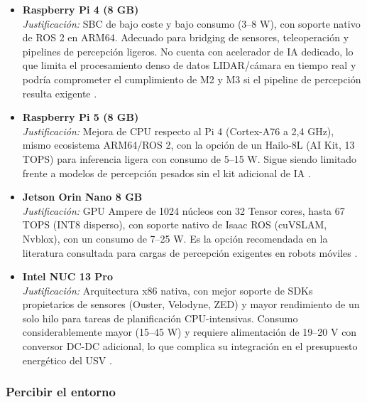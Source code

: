 \begin{itemize}

    \item \textbf{Raspberry Pi 4 (8 GB)} \\
    \textit{Justificación:} SBC de bajo coste y bajo consumo (3--8 W), con
    soporte nativo de ROS 2 en ARM64. Adecuado para bridging de sensores,
    teleoperación y pipelines de percepción ligeros. No cuenta con acelerador de IA dedicado,
    lo que limita el procesamiento denso de datos LIDAR/cámara en tiempo real y podría
    comprometer el cumplimiento de M2 y M3 si el
    pipeline de percepción resulta exigente \cite{Cite16}. \\

    \item \textbf{Raspberry Pi 5 (8 GB)} \\
    \textit{Justificación:} Mejora de CPU respecto al Pi 4 (Cortex-A76 a 2,4 GHz), mismo
    ecosistema ARM64/ROS 2, con la opción de un Hailo-8L (AI Kit, 13 TOPS) para inferencia
    ligera con consumo de 5--15 W. Sigue siendo limitado frente a
    modelos de percepción pesados sin el kit adicional de IA \cite{Cite16}. \\

    \item \textbf{Jetson Orin Nano 8 GB} \\
    \textit{Justificación:} GPU Ampere de 1024 núcleos con 32 Tensor cores, hasta 67 TOPS
    (INT8 disperso), con soporte nativo de Isaac ROS (cuVSLAM, Nvblox), con un consumo de 7--25 W. Es la opción
    recomendada en la literatura consultada para cargas de percepción exigentes en robots
    móviles \cite{Cite16}. \\

    \item \textbf{Intel NUC 13 Pro} \\
    \textit{Justificación:} Arquitectura x86 nativa, con mejor soporte de SDKs propietarios de
    sensores (Ouster, Velodyne, ZED) y mayor rendimiento de un solo hilo para tareas de
    planificación CPU-intensivas. Consumo considerablemente mayor (15--45 W) y requiere
    alimentación de 19--20 V con conversor DC-DC adicional, lo que complica su integración en
    el presupuesto energético del USV \cite{Cite16}. \\

\end{itemize}

\subsubsection*{Percibir el entorno}

